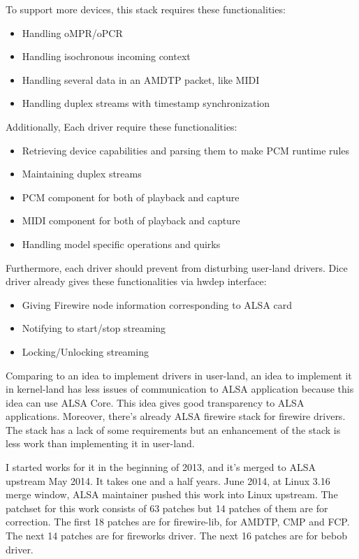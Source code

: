 \documentclass[onecolumn]{article}
\begin{document}
To support more devices, this stack requires these functionalities:
\begin{itemize}
\item Handling oMPR/oPCR
\item Handling isochronous incoming context
\item Handling several data in an AMDTP packet, like MIDI
\item Handling duplex streams with timestamp synchronization
\end{itemize}

Additionally, Each driver require these functionalities:
\begin{itemize}
\item Retrieving device capabilities and parsing them to make PCM runtime rules
\item Maintaining duplex streams
\item PCM component for both of playback and capture
\item MIDI component for both of playback and capture
\item Handling model specific operations and quirks
\end{itemize}

Furthermore, each driver should prevent from disturbing user-land drivers. Dice driver already gives these functionalities via hwdep interface:
\begin{itemize}
\item Giving Firewire node information corresponding to ALSA card
\item Notifying to start/stop streaming
\item Locking/Unlocking streaming
\end{itemize}

Comparing to an idea to implement drivers in user-land, an idea to implement it in kernel-land has less issues of communication to ALSA application because this idea can use ALSA Core. This idea gives good transparency to ALSA applications. Moreover, there's already ALSA firewire stack for firewire drivers. The stack has a lack of some requirements but an enhancement of the stack is less work than implementing it in user-land.

I started works for it in the beginning of 2013, and it's merged to ALSA upstream May 2014. It takes one and a half years. June 2014, at Linux 3.16 merge window, ALSA maintainer pushed this work into Linux upstream. The patchset for this work consists of 63 patches but 14 patches of them are for correction. The first 18 patches are for firewire-lib, for AMDTP, CMP and FCP. The next 14 patches are for fireworks driver. The next 16 patches are for bebob driver.
\end{document}
